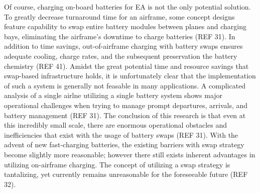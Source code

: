 \documentclass[../main.tex]{subfiles}
\begin{document}
Of course, charging on-board batteries for EA is not the only potential solution. To greatly decrease turnaround time for an airframe, some concept designs feature capability to swap entire battery modules between planes and charging bays, eliminating the airframe’s downtime to charge batteries (REF 31). In addition to time savings, out-of-airframe charging with battery swaps ensures adequate cooling, charge rates, and the subsequent preservation the battery chemistry (REF 41). Amidst the great potential time and resource savings that swap-based infrastructure holds, it is unfortunately clear that the implementation of such a system is generally not feasable in many applications. A complicated analysis of a single airlne utilizing a single battery system shows major operational challenges when trying to manage prompt departures, arrivals, and battery management (REF 31). The conclusion of this research is that even at this incredibly small scale, there are enormous operational obstacles and inefficiencies that exist with the usage of battery swaps (REF 31). With the advent of new fast-charging batteries, the existing barriers with swap strategy become slightly more reasonable; however there still exists inherent advantages in utilizing on-airframe charging.  The concept of utilizing a swap strategy is tantalizing, yet currently remains unreasonable for the foreseeable future (REF 32).\par
\end{document}
